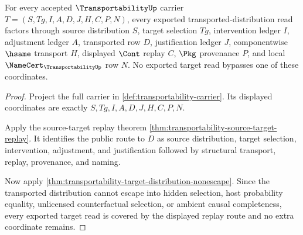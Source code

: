 \begin{theorem}
\label{thm:transportability-target-replay-coverage}
For every accepted $\TransportabilityUp$ carrier $T=(S,Tg,I,A,D,J,H,C,P,N)$, every exported transported-distribution read factors through source distribution $S$, target selection $Tg$, intervention ledger $I$, adjustment ledger $A$, transported row $D$, justification ledger $J$, componentwise $\hsame$ transport $H$, displayed $\Cont$ replay $C$, $\Pkg$ provenance $P$, and local $\NameCert_{\TransportabilityUp}$ row $N$. No exported target read bypasses one of these coordinates.
\end{theorem}
\begin{proof}
Project the full carrier in \autoref{def:transportability-carrier}. Its displayed coordinates are exactly $S,Tg,I,A,D,J,H,C,P,N$.

Apply the source-target replay theorem \autoref{thm:transportability-source-target-replay}. It identifies the public route to $D$ as source distribution, target selection, intervention, adjustment, and justification followed by structural transport, replay, provenance, and naming.

Now apply \autoref{thm:transportability-target-distribution-nonescape}. Since the transported distribution cannot escape into hidden selection, host probability equality, unlicensed counterfactual selection, or ambient causal completeness, every exported target read is covered by the displayed replay route and no extra coordinate remains.
\end{proof}

